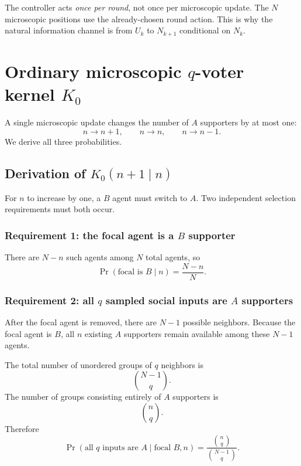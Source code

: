 \documentclass[11pt,a4paper]{article}
\newcommand{\Prb}{\operatorname{Pr}}
\newcommand{\1}{\mathbbm{1}}
\begin{document}
\begin{warningbox}
The controller acts \emph{once per round}, not once per microscopic update. The $N$ microscopic positions use the already-chosen round action. This is why the natural information channel is from $U_k$ to $N_{k+1}$ conditional on $N_k$.
\end{warningbox}

\section{Ordinary microscopic $q$-voter kernel $K_0$}

A single microscopic update changes the number of $A$ supporters by at most one:
\[
n\longrightarrow n+1,\qquad n\longrightarrow n,\qquad n\longrightarrow n-1.
\]
We derive all three probabilities.

\subsection{Derivation of $K_0(n+1\mid n)$}

For $n$ to increase by one, a $B$ agent must switch to $A$. Two independent selection requirements must both occur.

\subsubsection{Requirement 1: the focal agent is a $B$ supporter}

There are $N-n$ such agents among $N$ total agents, so
\begin{equation}
\Prb(\text{focal is }B\mid n)=\frac{N-n}{N}.
\label{eq:focalB}
\end{equation}

\subsubsection{Requirement 2: all $q$ sampled social inputs are $A$ supporters}

After the focal agent is removed, there are $N-1$ possible neighbors. Because the focal agent is $B$, all $n$ existing $A$ supporters remain available among these $N-1$ agents.

The total number of unordered groups of $q$ neighbors is
\[
\binom{N-1}{q}.
\]
The number of groups consisting entirely of $A$ supporters is
\[
\binom{n}{q}.
\]
Therefore
\begin{equation}
\Prb(\text{all }q\text{ inputs are }A\mid \text{focal }B,n)
=
\frac{\binom{n}{q}}{\binom{N-1}{q}}.
\label{eq:allA}
\end{equation}
\end{document}
